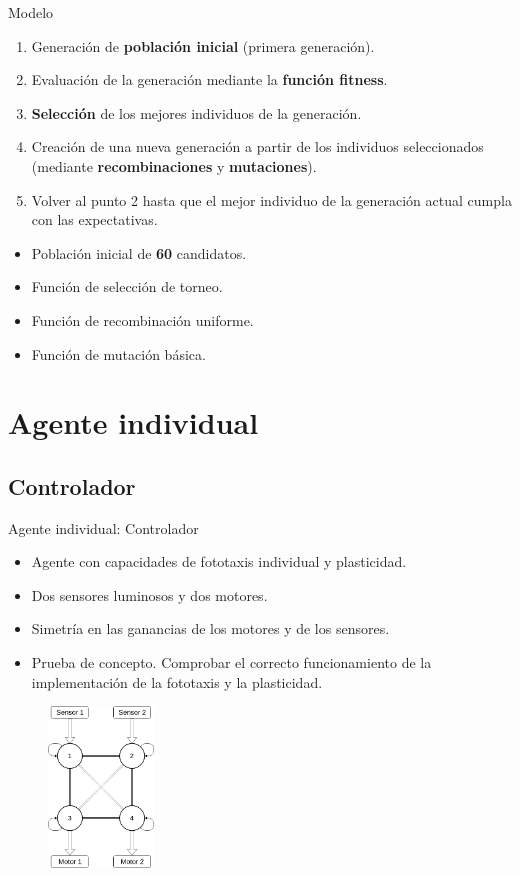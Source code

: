 \documentclass[aspectratio=169]{beamer}
\begin{document}
\begin{frame}{Modelo}
  \begin{enumerate}
    \item Generación de \textbf{población inicial} (primera generación).
    \item Evaluación de la generación mediante la \textbf{función fitness}.
    \item \textbf{Selección} de los mejores individuos de la generación.
    \item Creación de una nueva generación a partir de los individuos seleccionados (mediante \textbf{recombinaciones} y \textbf{mutaciones}).
    \item Volver al punto 2 hasta que el mejor individuo de la generación actual cumpla con las expectativas.
  \end{enumerate}

  \begin{itemize}
    \item Población inicial de \textbf{60} candidatos.
    \item Función de selección de torneo.
    \item Función de recombinación uniforme.
    \item Función de mutación básica.
  \end{itemize}
\end{frame}

\section{Agente individual}
\subsection{Controlador}
\begin{frame}{Agente individual: Controlador}
  \begin{itemize}
    \item Agente con capacidades de fototaxis individual y plasticidad.
    \item Dos sensores luminosos y dos motores.
    \item Simetría en las ganancias de los motores y de los sensores.
    \item Prueba de concepto. Comprobar el correcto funcionamiento de la implementación de la fototaxis y la plasticidad.
  \end{itemize}
  \begin{figure}
    \centering
  \includegraphics[width=0.25\textwidth,height=0.5\textheight]{Imagenes/Agent0Controller}
\end{figure}
\end{frame}
\end{document}
